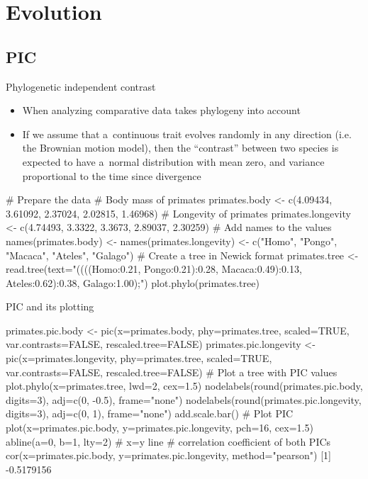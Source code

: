 \documentclass[compress, ucs, xelatex, 11pt, xcolor=svgnames,
  hyperref={
    bookmarks=true,
    unicode=true,
    colorlinks=true,
    pdftitle={Molecular data in R},
    plainpages=false,
    pdfauthor={Vojtech Zeisek},
    pdfsubject={Course about phylogeny and evolution in R},
    pdfcreator={XeLaTeX},
    pdfkeywords={R, evolution, phylogeny, molecular data},
    linkcolor=Tomato,
    anchorcolor=SaddleBrown,
    citecolor=Goldenrod,
    filecolor=DarkMagenta,
    menucolor=Sienna,
    urlcolor=DarkTurquoise,
    pdftex},
  url={hyphens, lowtilde} %
  ]{beamer}
\begin{document}
\section{Evolution}


\subsection{PIC}

\begin{frame}[fragile]{Phylogenetic independent contrast}
\begin{itemize}
 \item When analyzing comparative data takes phylogeny into account
 \item If we assume that a~continuous trait evolves randomly in any direction (i.e. the Brownian motion model), then the ``contrast'' between two species is expected to have a~normal distribution with mean zero, and variance proportional to the time since divergence
\end{itemize}
  \begin{spluscode}
    # Prepare the data # Body mass of primates
    primates.body <- c(4.09434, 3.61092, 2.37024, 2.02815, 1.46968)
    # Longevity of primates
    primates.longevity <- c(4.74493, 3.3322, 3.3673, 2.89037, 2.30259)
    # Add names to the values
    names(primates.body) <- names(primates.longevity) <- c("Homo", "Pongo",
      "Macaca", "Ateles", "Galago")
    # Create a tree in Newick format
    primates.tree <- read.tree(text="((((Homo:0.21, Pongo:0.21):0.28,
      Macaca:0.49):0.13, Ateles:0.62):0.38, Galago:1.00);")
    plot.phylo(primates.tree)
  \end{spluscode}
\end{frame}

\begin{frame}[fragile]{PIC and its plotting}
  \begin{spluscode}
    primates.pic.body <- pic(x=primates.body, phy=primates.tree,
      scaled=TRUE, var.contrasts=FALSE, rescaled.tree=FALSE)
    primates.pic.longevity <- pic(x=primates.longevity, phy=primates.tree,
      scaled=TRUE, var.contrasts=FALSE, rescaled.tree=FALSE)
    # Plot a tree with PIC values
    plot.phylo(x=primates.tree, lwd=2, cex=1.5)
    nodelabels(round(primates.pic.body, digits=3), adj=c(0, -0.5),
      frame="none")
    nodelabels(round(primates.pic.longevity, digits=3), adj=c(0, 1),
      frame="none")
    add.scale.bar()
    # Plot PIC
    plot(x=primates.pic.body, y=primates.pic.longevity, pch=16, cex=1.5)
    abline(a=0, b=1, lty=2) # x=y line
    # correlation coefficient of both PICs
    cor(x=primates.pic.body, y=primates.pic.longevity, method="pearson")
    [1] -0.5179156
  \end{spluscode}
\end{frame}
\end{document}
